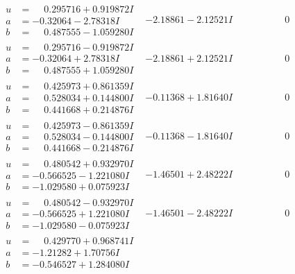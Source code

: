 \documentclass[1p]{elsarticle_modified}
\theoremstyle{definition}
\begin{document}
$$\begin{array}{c|c|c}
\begin{aligned}
u &= \phantom{-}0.295716 + 0.919872 I \\
a &= -0.32064 - 2.78318 I \\
b &= \phantom{-}0.487555 - 1.059280 I\end{aligned}
 & -2.18861 - 2.12521 I & \phantom{-0.000000 } 0 \\ \hline\begin{aligned}
u &= \phantom{-}0.295716 - 0.919872 I \\
a &= -0.32064 + 2.78318 I \\
b &= \phantom{-}0.487555 + 1.059280 I\end{aligned}
 & -2.18861 + 2.12521 I & \phantom{-0.000000 } 0 \\ \hline\begin{aligned}
u &= \phantom{-}0.425973 + 0.861359 I \\
a &= \phantom{-}0.528034 + 0.144800 I \\
b &= \phantom{-}0.441668 + 0.214876 I\end{aligned}
 & -0.11368 + 1.81640 I & \phantom{-0.000000 } 0 \\ \hline\begin{aligned}
u &= \phantom{-}0.425973 - 0.861359 I \\
a &= \phantom{-}0.528034 - 0.144800 I \\
b &= \phantom{-}0.441668 - 0.214876 I\end{aligned}
 & -0.11368 - 1.81640 I & \phantom{-0.000000 } 0 \\ \hline\begin{aligned}
u &= \phantom{-}0.480542 + 0.932970 I \\
a &= -0.566525 - 1.221080 I \\
b &= -1.029580 + 0.075923 I\end{aligned}
 & -1.46501 + 2.48222 I & \phantom{-0.000000 } 0 \\ \hline\begin{aligned}
u &= \phantom{-}0.480542 - 0.932970 I \\
a &= -0.566525 + 1.221080 I \\
b &= -1.029580 - 0.075923 I\end{aligned}
 & -1.46501 - 2.48222 I & \phantom{-0.000000 } 0 \\ \hline\begin{aligned}
u &= \phantom{-}0.429770 + 0.968741 I \\
a &= -1.21282 + 1.70756 I \\
b &= -0.546527 + 1.284080 I\end{aligned}

\end{array}$$
\end{document}
